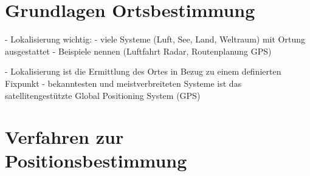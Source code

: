 \section{Grundlagen Ortsbestimmung}\label{Grundlagen Lokalisierung}
- Lokalisierung wichtig:
    - viele Systeme (Luft, See, Land, Weltraum) mit Ortung ausgestattet
    - Beispiele nennen (Luftfahrt Radar, Routenplanung GPS)

- Lokalisierung ist die Ermittlung des Ortes in Bezug zu einem definierten Fixpunkt
- bekanntesten und meistverbreiteten Systeme ist das satellitengestützte Global Positioning System (GPS)

\section{Verfahren zur Positionsbestimmung}\label{Verfahren zur Positionsbestimmung}
